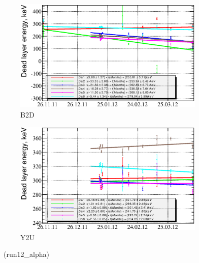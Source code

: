 \documentclass[a4paper,12pt]{article}
\begin{document}
\begin{figure}[htb]
\begin{subfigure}[t]{0.49\textwidth}
\includegraphics[width=\textwidth]{gfx/run12_alpha/B2D/c_chDeadLayerEnergy_by_day_B2D.eps}
\caption{B2D}
\end{subfigure}
%
\hfill
%
\begin{subfigure}[t]{0.49\textwidth}
\includegraphics[width=\textwidth]{gfx/run12_alpha/Y2U/c_chDeadLayerEnergy_by_day_Y2U.eps}
\caption{Y2U}
\end{subfigure}
\caption{\edllabellabel\ (run12\_alpha)}
\end{figure}
\end{document}
